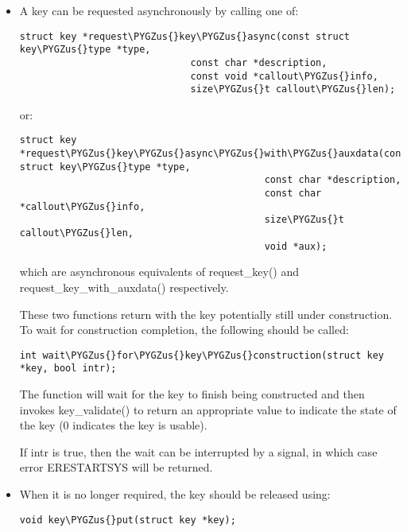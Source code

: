 \documentclass[a4paper,8pt,english]{sphinxmanual}
\def\PYGZus{\char`\_}
\begin{document}
\begin{itemize}
\item {} 
A key can be requested asynchronously by calling one of:

\begin{Verbatim}[commandchars=\\\{\}]
struct key *request\PYGZus{}key\PYGZus{}async(const struct key\PYGZus{}type *type,
                              const char *description,
                              const void *callout\PYGZus{}info,
                              size\PYGZus{}t callout\PYGZus{}len);
\end{Verbatim}

or:

\begin{Verbatim}[commandchars=\\\{\}]
struct key *request\PYGZus{}key\PYGZus{}async\PYGZus{}with\PYGZus{}auxdata(const struct key\PYGZus{}type *type,
                                           const char *description,
                                           const char *callout\PYGZus{}info,
                                           size\PYGZus{}t callout\PYGZus{}len,
                                           void *aux);
\end{Verbatim}

which are asynchronous equivalents of request\_key() and
request\_key\_with\_auxdata() respectively.

These two functions return with the key potentially still under
construction.  To wait for construction completion, the following should be
called:

\begin{Verbatim}[commandchars=\\\{\}]
int wait\PYGZus{}for\PYGZus{}key\PYGZus{}construction(struct key *key, bool intr);
\end{Verbatim}

The function will wait for the key to finish being constructed and then
invokes key\_validate() to return an appropriate value to indicate the state
of the key (0 indicates the key is usable).

If intr is true, then the wait can be interrupted by a signal, in which
case error ERESTARTSYS will be returned.

\item {} 
When it is no longer required, the key should be released using:

\begin{Verbatim}[commandchars=\\\{\}]
void key\PYGZus{}put(struct key *key);
\end{Verbatim}


\end{itemize}
\end{document}
